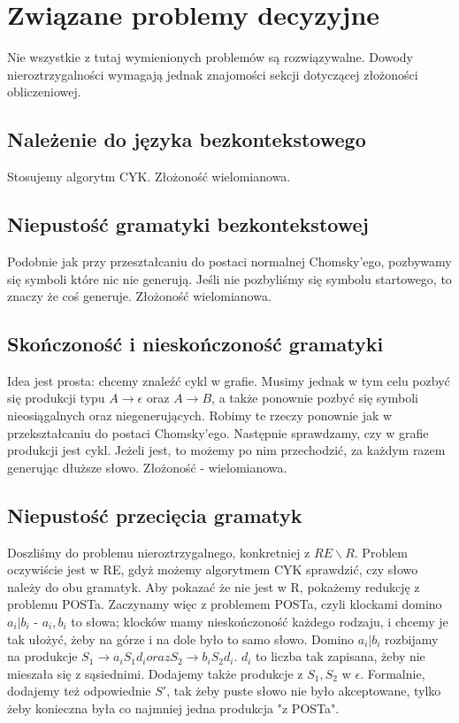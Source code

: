 \section{Związane problemy decyzyjne}

Nie wszystkie z tutaj wymienionych problemów są rozwiązywalne. Dowody nieroztrzygalności wymagają jednak znajomości sekcji dotyczącej złożoności obliczeniowej.

\subsection{Należenie do języka bezkontekstowego} 

Stosujemy algorytm CYK. Złożoność wielomianowa.

\subsection{Niepustość gramatyki bezkontekstowej}

Podobnie jak przy przeształcaniu do postaci normalnej Chomsky'ego, pozbywamy się symboli które nic nie generują. Jeśli nie pozbyliśmy się symbolu startowego, to znaczy że coś generuje. Złożoność wielomianowa.

\subsection{Skończoność i nieskończoność gramatyki}

Idea jest prosta: chcemy znaleźć cykl w grafie. Musimy jednak w tym celu pozbyć się produkcji typu \( A \rightarrow \epsilon \) oraz \( A \rightarrow B \), a także ponownie pozbyć się symboli nieosiągalnych oraz niegenerujących. Robimy te rzeczy ponownie jak w przekształcaniu do postaci Chomsky'ego. Następnie sprawdzamy, czy w grafie produkcji jest cykl. Jeżeli jest, to możemy po nim przechodzić, za każdym razem generując dłuższe słowo. Złożoność - wielomianowa.

\subsection{Niepustość przecięcia gramatyk}

Doszliśmy do problemu nieroztrzygalnego, konkretniej z \( RE \backslash R \). Problem oczywiście jest w RE, gdyż możemy algorytmem CYK sprawdzić, czy słowo należy do obu gramatyk. Aby pokazać że nie jest w R, pokażemy redukcję z problemu POSTa. Zaczynamy więc z problemem POSTa, czyli klockami domino \(a_i | b_i \) - \( a_i, b_i \) to słowa; klocków mamy nieskończoność każdego rodzaju, i chcemy je tak ułożyć, żeby na górze i na dole było to samo słowo.  Domino \(a_i | b_i \) rozbijamy na produkcje \( S_1 \rightarrow a_{i}S_{1}d_{i} oraz S_2 \rightarrow b_{i}S_{2}d_{i}\). \( d_i \) to liczba tak zapisana, żeby nie mieszała się z sąsiednimi. Dodajemy także produkcje z \( S_1, S_2 \) w \( \epsilon \). Formalnie, dodajemy też odpowiednie \( S' \), tak żeby puste słowo nie było akceptowane, tylko żeby konieczna była co najmniej jedna produkcja "z POSTa".

